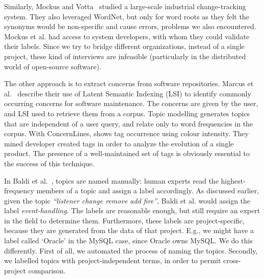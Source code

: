 \documentclass[]{sig-alternate}
\begin{document}
Similarly, Mockus and Votta~\cite{Mockus00} studied a large-scale industrial change-tracking system. 
They also leveraged WordNet, but only for word roots as they felt the synonyms would be non-specific and cause errors, problems we also encountered. 
Mockus et al. had access to system developers, with whom they could validate their labels. 
Since we try to bridge different organizations, instead of a single project, these kind of interviews are infeasible (particularly in the distributed world of open-source software).

The other approach is to extract concerns from software repositories.
Marcus et al.~\cite{marcus04wcre} describe their use of Latent Semantic Indexing (LSI) to identify commonly occurring concerns for software maintenance. The concerns are given by the user, and LSI used to retrieve them from a corpus. Topic modelling generates topics that are independent of a user query, and relate only to word frequencies in the corpus.
With ConcernLines, \cite{treude09cl} shows tag occurrence using colour intensity. 
They mined 
developer created tags 
in order to analyze the evolution of a single product.
The presence of a well-maintained set of tags is obviously essential to the success of this technique.


In Baldi et al.~\cite{Baldi2008}, topics are named manually: human experts read the highest-frequency members of a topic and assign a label accordingly. 
As discussed earlier, given the topic \emph{``listener change remove add fire''}, Baldi et al. would assign the label \emph{event-handling}. 
The labels are reasonable enough, but still require an expert in the field to determine them. 
Furthermore, these labels are project-specific, because they are generated from the data of that project. E.g., we might have a label called `Oracle' in the MySQL case, since Oracle owns MySQL. 
We do this differently.
First of all, we automated the process of naming the topics. Secondly, we labelled topics with project-independent terms, in order to permit cross-project comparison.
\end{document}
